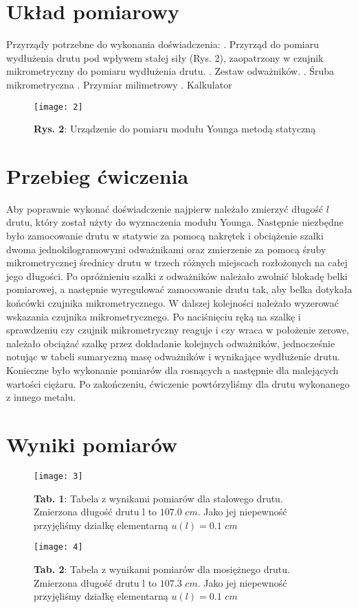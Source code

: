\documentclass[12pt]{article}
\begin{document}
\section{Układ pomiarowy} 
Przyrządy potrzebne do wykonania doświadczenia: . Przyrząd do pomiaru wydłużenia drutu pod wpływem stałej siły (Rys. 2), zaopatrzony w czujnik mikrometryczny do pomiaru wydłużenia drutu. . Zestaw odważników. . Śruba mikrometryczna . Przymiar milimetrowy . Kalkulator \newline
\begin{figure}[H]
\centering
\texttt{[image: 2]}
\caption*{\textbf{Rys. 2}: Urządzenie do pomiaru modułu Younga metodą statyczną }
\end{figure}
\section{Przebieg ćwiczenia}
Aby poprawnie wykonać doświadczenie najpierw należało zmierzyć długość $l$ drutu, który został użyty do wyznaczenia modułu Younga. Następnie niezbędne było zamocowanie drutu w statywie za pomocą nakrętek i obciążenie szalki dwoma jednokilogramowymi odważnikami oraz zmierzenie za pomocą śruby mikrometrycznej średnicy drutu w trzech różnych miejscach rozłożonych na całej jego długości. Po opróżnieniu szalki z odważników należało zwolnić blokadę belki pomiarowej, a następnie wyregulować zamocowanie drutu tak, aby belka dotykała końcówki czujnika mikrometrycznego. W dalszej kolejności należało wyzerować wskazania czujnika mikrometrycznego. Po naciśnięciu ręką na szalkę i sprawdzeniu czy czujnik mikrometryczny reaguje i czy wraca w położenie zerowe, należało obciążać szalkę przez dokładanie kolejnych odważników, jednocześnie notując w tabeli sumaryczną masę odważników i wynikające wydłużenie drutu. Konieczne było wykonanie pomiarów dla rosnących a następnie dla malejących wartości ciężaru. Po zakończeniu, ćwiczenie powtórzyliśmy dla drutu wykonanego z innego metalu. 
\section{Wyniki pomiarów}
\begin{figure}[H]
\centering
\texttt{[image: 3]}
\caption*{\textbf{Tab. 1}: Tabela z wynikami pomiarów dla stalowego drutu. Zmierzona długość drutu l to \newline $107.0$ $cm$. Jako jej niepewność przyjęliśmy działkę elementarną $u(l)=0.1$ $cm$}
\end{figure}
\begin{figure}[H]
\centering
\texttt{[image: 4]}
\caption*{\textbf{Tab. 2}: Tabela z wynikami pomiarów dla mosiężnego drutu. Zmierzona długość drutu l to \newline $107.3$ $cm$. Jako jej niepewność przyjęliśmy działkę elementarną $u(l)=0.1$ $cm$ }
\end{figure}
\end{document}

